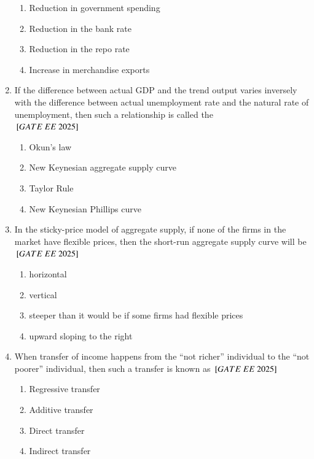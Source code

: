 \documentclass[journal,12pt,onecolumn]{IEEEtran}
\theoremstyle{remark}
\begin{document}
\begin{enumerate}
    \begin{enumerate}[label=(\Alph*)]
        \item Reduction in government spending
        \item Reduction in the bank rate
        \item Reduction in the repo rate
        \item Increase in merchandise exports
    \end{enumerate}

    \item If the difference between actual GDP and the trend output varies inversely with the difference between actual unemployment rate and the natural rate of unemployment, then such a relationship is called the\\      $\sbrak{GATE\ EE\ 2025}$\\
    \begin{enumerate}[label=(\Alph*)]
        \item Okun's law
        \item New Keynesian aggregate supply curve
        \item Taylor Rule
        \item New Keynesian Phillips curve
    \end{enumerate}

    \item In the sticky-price model of aggregate supply, if none of the firms in the market have flexible prices, then the short-run aggregate supply curve will be
     $\sbrak{GATE\ EE\ 2025}$\\
    \begin{enumerate}[label=(\Alph*)]
        

        \item horizontal
        \item vertical
        \item steeper than it would be if some firms had flexible prices
        \item upward sloping to the right
    \end{enumerate}
\item When transfer of income happens from the ``not richer'' individual to the ``not poorer'' individual, then such a transfer is known as
$\sbrak{GATE\ EE\ 2025}$\\
    \begin{enumerate}[label=(\Alph*)]
    \item Regressive transfer
    \item Additive transfer
    \item Direct transfer
    \item Indirect transfer
    \end{enumerate}
 

\end{enumerate}
\end{document}
